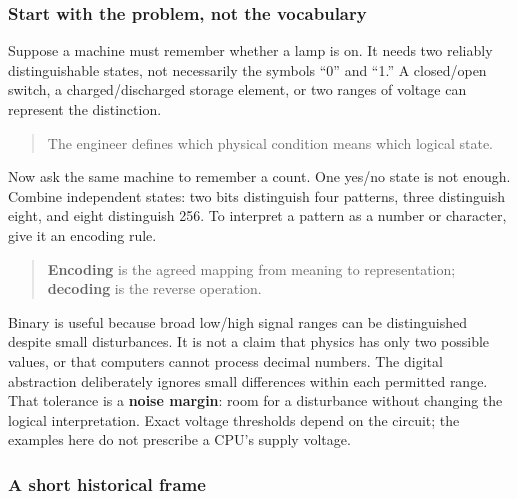 \hypertarget{01-foundations-i-ch001-prologue---how-a-physical-state-became-a-byte}{}

\subsubsection{Start with the problem, not the vocabulary}\label{01-foundations-i-ch001-start-with-the-problem-not-the-vocabulary}

\hypertarget{01-foundations-i-ch001-start-with-the-problem-not-the-vocabulary}{}

Suppose a machine must remember whether a lamp is on. It needs two reliably distinguishable states, not necessarily the symbols ``0'' and ``1.'' A closed/open switch, a charged/discharged storage element, or two ranges of voltage can represent the distinction.

\begin{quote}
The engineer defines which physical condition means which logical state.
\end{quote}

Now ask the same machine to remember a count. One yes/no state is not enough. Combine independent states: two bits distinguish four patterns, three distinguish eight, and eight distinguish 256. To interpret a pattern as a number or character, give it an encoding rule.

\begin{quote}
\textbf{Encoding} is the agreed mapping from meaning to representation; \textbf{decoding} is the reverse operation.
\end{quote}

Binary is useful because broad low/high signal ranges can be distinguished despite small disturbances. It is not a claim that physics has only two possible values, or that computers cannot process decimal numbers. The digital abstraction deliberately ignores small differences within each permitted range. That tolerance is a \textbf{noise margin}: room for a disturbance without changing the logical interpretation. Exact voltage thresholds depend on the circuit; the examples here do not prescribe a CPU's supply voltage.

\subsubsection{A short historical frame}\label{01-foundations-i-ch001-a-short-historical-frame}

\hypertarget{01-foundations-i-ch001-a-short-historical-frame}{}

